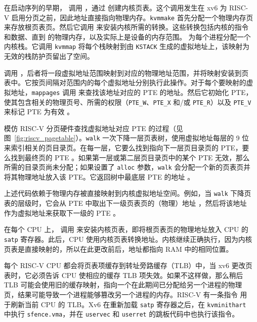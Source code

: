 在启动序列的早期， 调用  ，通过   创建内核页表。这个调用发生在 xv6 为 RISC-V 启用分页之前，因此地址直接指向物理内存。\lstinline{kvmmake} 首先分配一个物理内存页来存放根页表页。然后它调用  来安装内核所需的转换。这些转换包括内核的指令和数据、直到  的物理内存，以及实际上是设备的内存范围。  为每个进程分配一个内核栈。它调用 \lstinline{kvmmap} 将每个栈映射到由 \lstinline{KSTACK} 生成的虚拟地址上，该映射为无效的栈防护页留出了空间。

  调用  ，后者将一段虚拟地址范围映射到对应的物理地址范围，并将映射安装到页表中。它按页间隔对范围内的每个虚拟地址分别执行此操作。对于每个要映射的虚拟地址，\lstinline{mappages} 调用  来查找该地址对应的 PTE 的地址。然后它初始化 PTE，使其包含相关的物理页号、所需的权限（\lstinline{PTE_W}、\lstinline{PTE_X} 和/或 \lstinline{PTE_R}）以及 \lstinline{PTE_V} 来标记 PTE 为有效 。

  模仿 RISC-V 分页硬件查找虚拟地址对应 PTE 的过程（见图~\ref{fig:riscv_pagetable}）。\lstinline{walk} 一次下降一层页表树，使用虚拟地址每层的 9 位来索引相关的页目录页。在每一层，它要么找到指向下一层页目录页的 PTE，要么找到最终页的 PTE 。如果第一层或第二层页目录页中的某个 PTE 无效，那么所需的目录页尚未分配；如果设置了 \lstinline{alloc} 参数，\lstinline{walk} 会分配一个新的页表页并将其物理地址放入该 PTE。它返回树中最底层 PTE 的地址 。

上述代码依赖于物理内存被直接映射到内核虚拟地址空间。例如，当 \lstinline{walk} 下降页表的层级时，它会从 PTE 中取出下一级页表页的（物理）地址 ，然后将该地址作为虚拟地址来获取下一级的 PTE 。

在每个 CPU 上， 调用   来安装内核页表，即将根页表页的物理地址放入 CPU 的 \texttt{satp} 寄存器。此后，CPU 使用内核页表转换地址。内核继续正确执行，因为内核页表是直接映射的，所以在此更改前后，地址都指向 RAM 中的相同位置。

每个 RISC-V CPU 都会将页表项缓存到转址旁路缓存（TLB）中，当 xv6 更改页表时，它必须告诉 CPU 使相应的缓存 TLB 项失效。如果不这样做，那么稍后 TLB 可能会使用旧的缓存映射，指向一个在此期间已分配给另一个进程的物理页，结果可能导致一个进程能够篡改另一个进程的内存。RISC-V 有一条指令  用于刷新当前 CPU 的 TLB。Xv6 在重新加载 \texttt{satp} 寄存器之后，在 {\tt kvminithart} 中执行 {\tt sfence.vma}，并在 \lstinline{uservec} 和 \lstinline{userret} 的跳板代码中也执行该指令。

